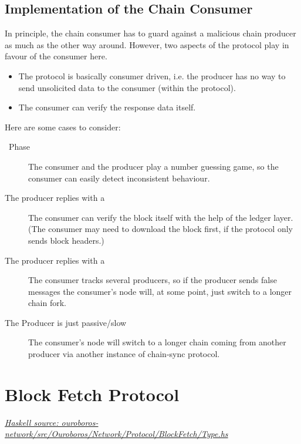 \documentclass{report}
\newcommand{\hsref}[1]{\href{https://github.com/input-output-hk/ouroboros-network/blob/master/#1}{\emph{Haskell source: #1}}}
\newcommand{\wip}[1]{\color{magenta}{#1}\color{black}}
\newcommand{\state}[1]{\texttt{#1}}
\newcommand{\msg}[1]{\texttt{#1}}
\newcommand{\Idle}{\state{Idle}}
\newcommand{\Busy}{\state{Busy}}
\newcommand{\Done}{\state{Done}}
\theoremstyle{definition}{
  \newtheorem{lemma}{Lemma}[section] %
  \newtheorem{definition}[lemma]{Definition}
}
\theoremstyle{theorem}{
  \newtheorem{invariant}[lemma]{Invariant}
  \newtheorem{proofobligation}[lemma]{Proof Obligation}
}
\numberwithin{equation}{lemma}
\begin{document}
\subsection{Implementation of the Chain Consumer}
In principle, the chain consumer has to guard against a malicious chain producer
as much as the other way around.
However, two aspects of the protocol play in favour of the consumer here.
\begin{itemize}
  \item The protocol is basically consumer driven, i.e. the producer has no way to send unsolicited
data to the consumer (within the protocol).
  \item The consumer can verify the response data itself.
\end{itemize}
Here are some cases to consider:
\begin{description}
\item[\FindIntersect~Phase]
  The consumer and the producer play a number guessing game, so the consumer can easily detect
  inconsistent behaviour.
\item[The producer replies with a \RollForward] The consumer can verify the block itself
  with the help of the ledger layer.
  (The consumer may need to download the block first, if the protocol only sends block headers.)
\item[The producer replies with a \RollBackward] The consumer tracks several producers, so
  if the producer sends false \RollBackward{} messages the consumer's node
  will, at some point, just switch to a longer chain fork.
\item[The Producer is just passive/slow] The consumer's node will switch to
  a longer chain coming from another producer via another instance of
    chain-sync protocol.
\end{description}
\wip{This should be explained in detail}

\section{Block Fetch Protocol}
\label{block-fetching-protocol}

\hsref{ouroboros-network/src/Ouroboros/Network/Protocol/BlockFetch/Type.hs}
\renewcommand{\Idle}{\state{Idle}}
\renewcommand{\Busy}{\state{Busy}}
\newcommand{\Streaming}{\state{Streaming}}
\renewcommand{\Done}{\state{Done}}
\newcommand{\RequestRange}{\msg{RequestRange}}
\newcommand{\StartBatch}{\msg{StartBatch}}
\newcommand{\NoBlocks}{\msg{NoBlocks}}
\newcommand{\Block}{\msg{Block}}
\newcommand{\BatchDone}{\msg{BatchDone}}
\newcommand{\ClientDone}{\msg{ClientDone}}
\end{document}
